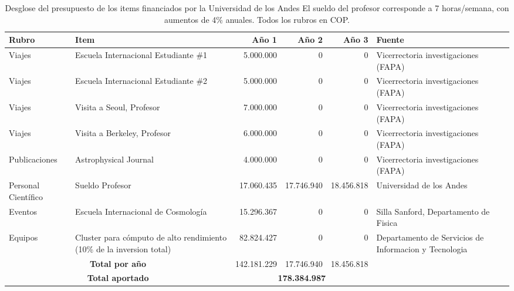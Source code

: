 \begin{table}[h]
\begin{center}
\begin{tabular}{|l|p{3.0cm}|r|r|r|p{2.5cm}|}\hline
{\bf Rubro}	&{\bf Item}	& {\bf Año 1}	& {\bf Año 2}	& {\bf Año 3}	& {\bf Fuente}\\	\hline
Viajes	&Escuela Internacional Estudiante \#1	&5.000.000	&0	&0	&Vicerrectoria investigaciones (FAPA)	\\\hline
Viajes	&Escuela Internacional Estudiante \#2	&5.000.000	&0	&0	&Vicerrectoria investigaciones (FAPA)	\\\hline
Viajes	&Visita a Seoul, Profesor	&7.000.000	&0	&0	&Vicerrectoria investigaciones (FAPA)	\\\hline
Viajes	&Visita a Berkeley, Profesor	&6.000.000	&0	&0	&Vicerrectoria investigaciones (FAPA)	\\\hline
Publicaciones	&Astrophysical Journal	&4.000.000	&0	&0	&Vicerrectoria investigaciones (FAPA)	\\\hline
Personal Científico	&Sueldo Profesor	&17.060.435	&17.746.940	&18.456.818	&Universidad de los Andes\\	\hline
Eventos	&Escuela Internacional de Cosmología	&15.296.367	&0	&0	&Silla Sanford, Departamento de Fisica	\\\hline
Equipos	&Cluster para c\'omputo de alto rendimiento (10\% de la inversion total)	&82.824.427	&0	&0	&Departamento de Servicios de Informacion y Tecnologia\\\hline
\multicolumn{2}{|c|}{{\bf Total por año}}&	142.181.229	&17.746.940	&18.456.818&\\\hline
\multicolumn{2}{|c|}{{\bf Total aportado}}&	 \multicolumn{3}{|c|}{{\bf 178.384.987}}&\\\hline
\end{tabular} 
\caption{Desglose del presupuesto de los items financiados por la Universidad de los Andes
 El sueldo del profesor corresponde a 7 horas/semana, con aumentos de 4\% anuales. Todos los rubros en COP. }
\end{center}
\label{Resumen Presupuesto Colciencias}
\end{table}

